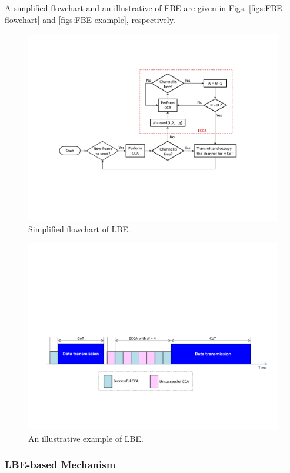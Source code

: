 \documentclass[12pt,onecolumn]{article}
\begin{document}
A simplified flowchart and an illustrative of FBE are given in Figs. \ref{figs:FBE-flowchart} and \ref{figs:FBE-example}, respectively.



\begin{figure}[!t]
\centering
\includegraphics[width=0.9\columnwidth]{figures2/LBE-flowchart}
\caption{Simplified flowchart of LBE.}
\label{figs:LBE-flowchart}
\end{figure}

\begin{figure}[!t]
\centering
\includegraphics[width=0.9\columnwidth]{figures2/LBE-example}
\caption{An illustrative example of LBE.}
\label{figs:LBE-example}
\end{figure}

\subsubsection{LBE-based Mechanism}
\end{document}
